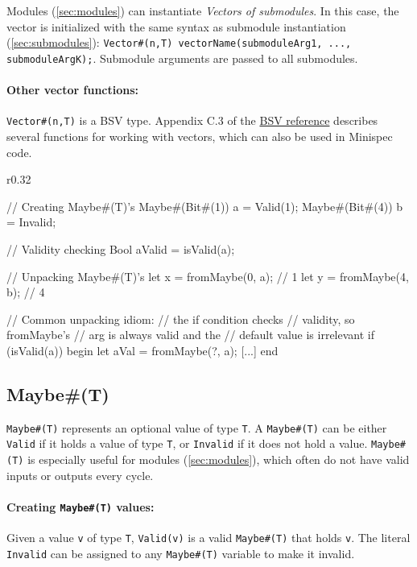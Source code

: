 Modules (\autoref{sec:modules}) can instantiate \emph{Vectors of submodules}.
In this case, the vector is initialized with the same syntax as submodule instantiation (\autoref{sec:submodules}):
\verb|Vector#(n,T) vectorName(submoduleArg1, ..., submoduleArgK);|. Submodule arguments are passed to all submodules.

\paragraph{Other vector functions:} \verb|Vector#(n,T)| is a BSV type.
Appendix C.3 of the \href{TODO}{BSV reference} describes several functions for working with vectors,
which can also be used in Minispec code.

\begin{wrapfigure}{r}{0.32\columnwidth}
\vspace{-4em}
\begin{mscode}
// Creating Maybe#(T)'s
Maybe#(Bit#(1)) a = Valid(1);
Maybe#(Bit#(4)) b = Invalid;

// Validity checking
Bool aValid = isValid(a);

// Unpacking Maybe#(T)'s
let x = fromMaybe(0, a); // 1
let y = fromMaybe(4, b); // 4

// Common unpacking idiom:
// the if condition checks
// validity, so fromMaybe's
// arg is always valid and the
// default value is irrelevant
if (isValid(a)) begin
  let aVal = fromMaybe(?, a);
  [...]
end
\end{mscode}
\vspace{-5em}
\end{wrapfigure}

\subsection{Maybe\#(T)}
\label{sec:maybe}

\verb|Maybe#(T)| represents an optional value of type \verb|T|.
A \verb|Maybe#(T)| can be either \verb|Valid| if it holds a value of type \verb|T|,
or \verb|Invalid| if it does not hold a value.
\verb|Maybe#(T)| is especially useful for modules (\autoref{sec:modules}),
which often do not have valid inputs or outputs every cycle.

\paragraph{Creating \texttt{Maybe\#(T)} values:} Given a value \verb|v| of type \verb|T|,
\verb|Valid(v)| is a valid \verb|Maybe#(T)| that holds \verb|v|.
The literal \verb|Invalid| can be assigned to any \verb|Maybe#(T)|
variable to make it invalid.

